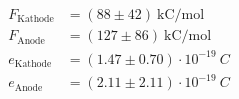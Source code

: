 \begin{align*}
F_\text{Kathode} &= (88 \pm 42)~\text{kC/mol}\\
F_\text{Anode} &= (127 \pm 86)~\text{kC/mol} \\
e_\text{Kathode} &= (1.47 \pm 0.70)\cdot 10^{-19}~C \\
e_\text{Anode} &= (2.11 \pm 2.11)\cdot 10^{-19}~C  
\end{align*}
